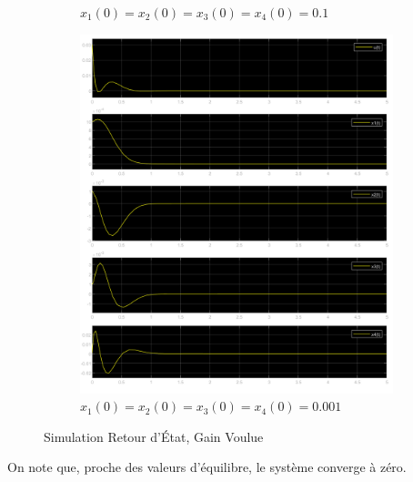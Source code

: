 \documentclass[class=article, crop=false]{standalone}
\begin{document}
\begin{resolution}
\begin{figure}[H]
\begin{subfigure}[b]{0.475\textwidth}
            \caption{$x_1(0) = x_2(0) = x_3(0) = x_4(0) = 0.1$}
        \end{subfigure}
        \begin{subfigure}[b]{0.475\textwidth}
            \centering
            \includegraphics[width=\textwidth]{../images/simulink_scope3_0_001.png}
            \caption{$x_1(0) = x_2(0) = x_3(0) = x_4(0) = 0.001$}
        \end{subfigure}
        \caption{Simulation Retour d'État, Gain Voulue}
    \end{figure}
    On note que, proche des valeurs d'équilibre, le système converge à zéro.
\end{resolution}

\newpage
\end{document}

